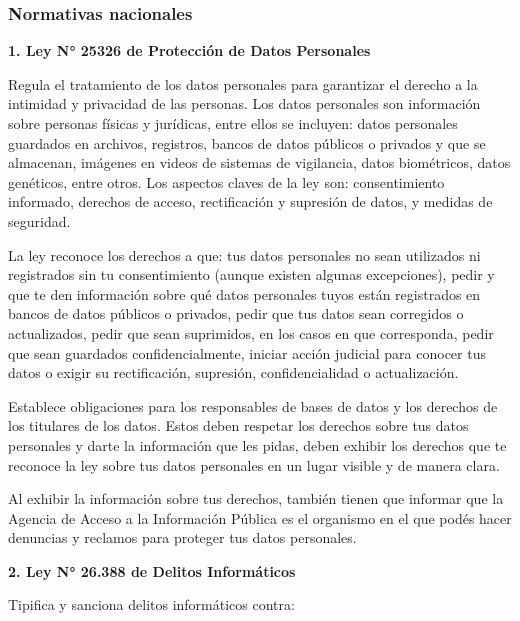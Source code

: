 \documentclass[a4paper,12pt]{article}
\newcommand{\saltolinea}{\par\vspace{\baselineskip}}
\begin{document}
    \subsubsection{Normativas nacionales}
    \par \textbf{1. Ley N° 25326 de Protección de Datos Personales} \saltolinea
    \par Regula el tratamiento de los datos personales para garantizar el derecho a la intimidad y privacidad de las personas. Los datos personales son información sobre personas físicas y jurídicas, entre ellos se incluyen: datos personales guardados en archivos, registros, bancos de datos públicos o privados y que se almacenan, imágenes en videos de sistemas de vigilancia, datos biométricos, datos genéticos, entre otros. Los aspectos claves de la ley son: consentimiento informado, derechos de acceso, rectificación y supresión de datos, y medidas de seguridad.
    \par La ley reconoce los derechos a que: tus datos personales no sean utilizados ni registrados sin tu consentimiento (aunque existen algunas excepciones), pedir y que te den información sobre qué datos personales tuyos están registrados en bancos de datos públicos o privados, pedir que tus datos sean corregidos o actualizados, pedir que sean suprimidos, en los casos en que corresponda, pedir que sean guardados confidencialmente, iniciar acción judicial para conocer tus datos o exigir su rectificación, supresión, confidencialidad o actualización.
    \par Establece obligaciones para los responsables de bases de datos y los derechos de los titulares de los datos. Estos deben respetar los derechos sobre tus datos personales y darte la información que les pidas, deben exhibir los derechos que te reconoce la ley sobre tus datos personales en un lugar visible y de manera clara.
    \par Al exhibir la información sobre tus derechos, también tienen que informar que la Agencia de Acceso a la Información Pública es el organismo en el que podés hacer denuncias y reclamos para proteger tus datos personales.\cite{Ley25326}
    \saltolinea
    \par \textbf{2. Ley N° 26.388 de Delitos Informáticos} 
    \saltolinea
    \par Tipifica y sanciona delitos informáticos contra:
\end{document}
